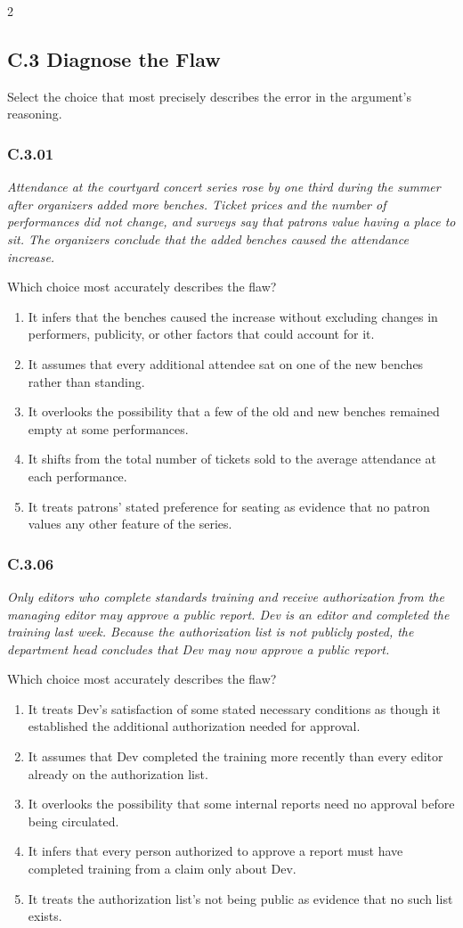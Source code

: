 \documentclass[10pt]{extarticle}
\newcommand{\choice}[1]{\item #1}
\newcommand{\bankitem}[1]{\subsubsection*{#1}}
\begin{document}
\begin{multicols}{2}
\subsection*{C.3 Diagnose the Flaw}
Select the choice that most precisely describes the error in the argument's reasoning.
\begin{samepage}
\bankitem{C.3.01}
\emph{Attendance at the courtyard concert series rose by one third during the summer after organizers added more benches. Ticket prices and the number of performances did not change, and surveys say that patrons value having a place to sit. The organizers conclude that the added benches caused the attendance increase.}

Which choice most accurately describes the flaw?
\begin{enumerate}[label=(\alph*)]
  \choice{It infers that the benches caused the increase without excluding changes in performers, publicity, or other factors that could account for it.}
  \choice{It assumes that every additional attendee sat on one of the new benches rather than standing.}
  \choice{It overlooks the possibility that a few of the old and new benches remained empty at some performances.}
  \choice{It shifts from the total number of tickets sold to the average attendance at each performance.}
  \choice{It treats patrons' stated preference for seating as evidence that no patron values any other feature of the series.}
\end{enumerate}
\end{samepage}\par\smallskip
\begin{samepage}
\bankitem{C.3.06}
\emph{Only editors who complete standards training and receive authorization from the managing editor may approve a public report. Dev is an editor and completed the training last week. Because the authorization list is not publicly posted, the department head concludes that Dev may now approve a public report.}

Which choice most accurately describes the flaw?
\begin{enumerate}[label=(\alph*)]
  \choice{It treats Dev's satisfaction of some stated necessary conditions as though it established the additional authorization needed for approval.}
  \choice{It assumes that Dev completed the training more recently than every editor already on the authorization list.}
  \choice{It overlooks the possibility that some internal reports need no approval before being circulated.}
  \choice{It infers that every person authorized to approve a report must have completed training from a claim only about Dev.}
  \choice{It treats the authorization list's not being public as evidence that no such list exists.}
\end{enumerate}
\end{samepage}\par\smallskip

\end{multicols}
\end{document}
